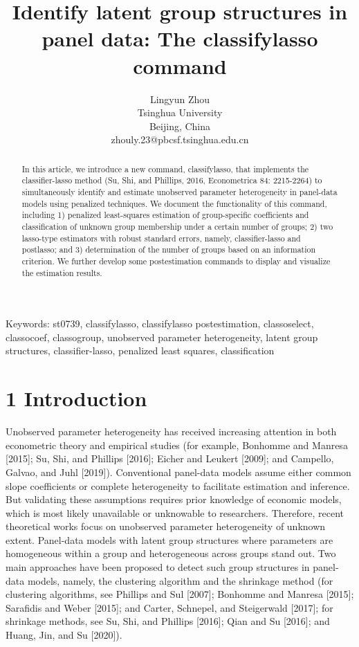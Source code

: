 \documentclass[10pt]{article}
\title{Identify latent group structures in panel data: The classifylasso command }
\author{Lingyun Zhou\\
Tsinghua University\\
Beijing, China\\
zhouly.23@pbcsf.tsinghua.edu.cn}
\date{}
\begin{document}
\maketitle
\captionsetup{singlelinecheck=false}


\begin{abstract}
In this article, we introduce a new command, classifylasso, that implements the classifier-lasso method (Su, Shi, and Phillips, 2016, Econometrica 84: 2215-2264) to simultaneously identify and estimate unobserved parameter heterogeneity in panel-data models using penalized techniques. We document the functionality of this command, including 1) penalized least-squares estimation of group-specific coefficients and classification of unknown group membership under a certain number of groups; 2) two lasso-type estimators with robust standard errors, namely, classifier-lasso and postlasso; and 3) determination of the number of groups based on an information criterion. We further develop some postestimation commands to display and visualize the estimation results.
\end{abstract}

Keywords: st0739, classifylasso, classifylasso postestimation, classoselect, classocoef, classogroup, unobserved parameter heterogeneity, latent group structures, classifier-lasso, penalized least squares, classification

\section*{1 Introduction}
Unobserved parameter heterogeneity has received increasing attention in both econometric theory and empirical studies (for example, Bonhomme and Manresa [2015]; Su, Shi, and Phillips [2016]; Eicher and Leukert [2009]; and Campello, Galvao, and Juhl [2019]). Conventional panel-data models assume either common slope coefficients or complete heterogeneity to facilitate estimation and inference. But validating these assumptions requires prior knowledge of economic models, which is most likely unavailable or unknowable to researchers. Therefore, recent theoretical works focus on unobserved parameter heterogeneity of unknown extent. Panel-data models with latent group structures where parameters are homogeneous within a group and heterogeneous across groups stand out. Two main approaches have been proposed to detect such group structures in panel-data models, namely, the clustering algorithm and the shrinkage method (for clustering algorithms, see Phillips and Sul [2007]; Bonhomme and Manresa [2015]; Sarafidis and Weber [2015]; and Carter, Schnepel, and Steigerwald [2017]; for\\[0pt]
shrinkage methods, see Su, Shi, and Phillips [2016]; Qian and Su [2016]; and Huang, Jin, and Su [2020]).
\end{document}
